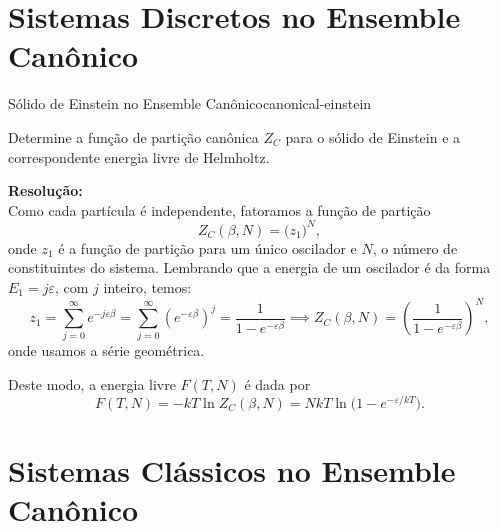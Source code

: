 \section{Sistemas Discretos no Ensemble Canônico}

\begin{solved}{Sólido de Einstein no Ensemble Canônico}{canonical-einstein}

    Determine a função de partição canônica $Z_C$ para o sólido de Einstein e a correspondente energia livre de Helmholtz.
    
    \tcblower 
    \textbf{Resolução:}\\
    Como cada partícula é independente, fatoramos a função de partição \[Z_C(\beta,N)=\big(z_1\big)^N,\] onde $z_1$ é a função de partição para um único oscilador e $N$, o número de constituintes do sistema. Lembrando que a energia de um oscilador é da forma $E_1=j\varepsilon$, com $j$ inteiro, temos: \[z_1=\sum_{j=0}^{\infty}e^{-j\varepsilon\beta}=\sum_{j=0}^{\infty}\left(e^{-\varepsilon\beta}\right)^j=\frac{1}{1-e^{-\varepsilon\beta}}\implies Z_C(\beta,N)=\left(\frac{1}{1-e^{-\varepsilon\beta}}\right)^N,\] onde usamos a série geométrica.

    Deste modo, a energia livre $F(T,N)$ é dada por
    \[F(T,N)=-kT\ln Z_C(\beta,N) =NkT\ln\big(1-e^{-\varepsilon/kT}\big).\]
\end{solved}

\section{Sistemas Clássicos no Ensemble Canônico}

